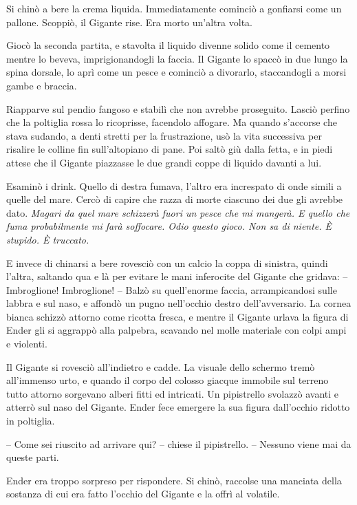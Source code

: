 {Si chinò a bere la crema liquida. Immediatamente cominciò a gonfiarsi
	come un pallone. Scoppiò, il Gigante rise. Era morto un'altra volta.}

{Giocò la seconda partita, e stavolta il liquido divenne solido come il
	cemento mentre lo beveva, imprigionandogli la faccia. Il Gigante lo
	spaccò in due lungo la spina dorsale, lo aprì come un pesce e cominciò a
	divorarlo, staccandogli a morsi gambe e braccia.}

{Riapparve sul pendio fangoso e stabilì che non avrebbe proseguito.
	Lasciò perfino che la poltiglia rossa lo ricoprisse, facendolo affogare.
	Ma quando s'accorse che stava sudando, a denti stretti per la
	frustrazione, usò la vita successiva per risalire le colline fin
	sull'altopiano di pane. Poi saltò giù dalla fetta, e in piedi attese che
	il Gigante piazzasse le due grandi coppe di liquido davanti a lui.}

{Esaminò i drink. Quello di destra fumava, l'altro era increspato di
	onde simili a quelle del mare. Cercò di capire che razza di morte
	ciascuno dei due gli avrebbe dato. \emph{Magari da quel mare schizzerà
		fuori un pesce che mi mangerà. E quello che fuma probabilmente mi farà
		soffocare. Odio questo gioco. Non sa di niente. È stupido. È truccato.}}

{E invece di chinarsi a bere rovesciò con un calcio la coppa di
	sinistra, quindi l'altra, saltando qua e là per evitare le mani
	inferocite del Gigante che gridava: -- Imbroglione! Imbroglione! --
	Balzò su quell'enorme faccia, arrampicandosi sulle labbra e sul naso, e
	affondò un pugno nell'occhio destro dell'avversario. La cornea bianca
	schizzò attorno come ricotta fresca, e mentre il Gigante urlava la
	figura di Ender gli si aggrappò alla palpebra, scavando nel molle
	materiale con colpi ampi e violenti.}

{Il Gigante si rovesciò all'indietro e cadde. La visuale dello schermo
	tremò all'immenso urto, e quando il corpo del colosso giacque immobile
	sul terreno tutto attorno sorgevano alberi fitti ed intricati. Un
	pipistrello svolazzò avanti e atterrò sul naso del Gigante. Ender fece
	emergere la sua figura dall'occhio ridotto in poltiglia.}

{-- Come sei riuscito ad arrivare qui? -- chiese il pipistrello. --
	Nessuno viene mai da queste parti.}

{Ender era troppo sorpreso per rispondere. Si chinò, raccolse una
	manciata della sostanza di cui era fatto l'occhio del Gigante e la offrì
	al volatile.}

